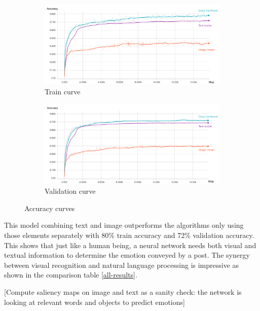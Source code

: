 \documentclass{article} %
\begin{document}
\begin{figure}[H]
    \begin{subfigure}[t]{.5\textwidth}
        \vskip 0pt %
        \centering
        \includegraphics[width=\linewidth]{Images/train.jpg}
        \caption{Train curve}
   \end{subfigure}
   \begin{subfigure}[t]{.5\textwidth}
       \vskip 0pt
       \centering
       \includegraphics[width=\linewidth]{Images/validation.jpg}
       \caption{Validation curve}
    \end{subfigure}
    \caption{Accuracy curves}
    \label{train-validation}
\end{figure}

This model combining text and image outperforms the algorithms only using those elements separately with 80\% train accuracy and 72\% validation accuracy. This shows that just like a human being, a neural network needs both visual and textual information to determine the emotion conveyed by a post. The synergy between visual recognition and natural language processing is impressive as shown in the comparison table \ref{all-results}.

[Compute saliency maps on image and text as a sanity check: the network is looking at relevant words and objects to predict emotions]
\end{document}
